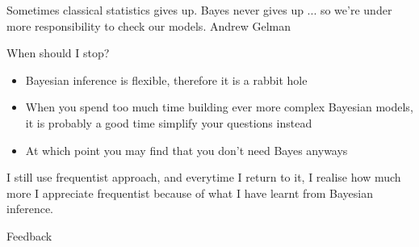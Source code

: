 \documentclass[12pt]{beamer}
\begin{document}
\begin{frame}
Sometimes classical statistics gives up. Bayes never gives up ... so we're under more responsibility to check our models.
Andrew Gelman
\end{frame}

\begin{frame}{When should I stop?}
\begin{itemize}
\item Bayesian inference is flexible, therefore it is a rabbit hole
\item When you spend too much time building ever more complex Bayesian models, it is probably a good time simplify your questions instead
\item At which point you may find that you don't need Bayes anyways
\end{itemize}
\end{frame}

\begin{frame}
I still use frequentist approach, and everytime I return to it, I realise how much more I appreciate frequentist because of what I have learnt from Bayesian inference.
\end{frame}

\begin{frame}{Feedback}

\end{frame}
\end{document}
